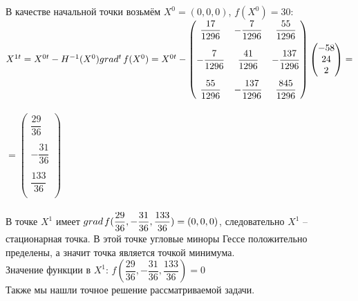 \documentclass[14pt,a4paper,fleqn]{extarticle}
\begin{document}
	В качестве начальной точки возьмём $X^0 = (0,0,0)$, $f(X^0) = 30$:\\
	
	$X^{1t} = X^{0t} - H^{-1}(X^0)grad^t\hspace*{0.05cm}f(X^0) = X^{0t} - \begin{pmatrix}
		\dfrac{17}{1296} & -\dfrac{7}{1296} & \dfrac{55}{1296}\\\\
		-\dfrac{7}{1296} & \dfrac{41}{1296} & -\dfrac{137}{1296}\\\\
		\dfrac{55}{1296} & -\dfrac{137}{1296} & \dfrac{845}{1296}\\
	\end{pmatrix}\begin{pmatrix}-58\\ 24\\ 2\\ \end{pmatrix} =$\\\\
	$= \begin{pmatrix}\dfrac{29}{36}\\\\ -\dfrac{31}{36}\\\\ \dfrac{133}{36}\\ \end{pmatrix}$\\\\
	
	В точке $X^1$ имеет $grad\hspace*{0.05cm}f(\dfrac{29}{36}, -\dfrac{31}{36}, \dfrac{133}{36}) = (0,0,0)$, следовательно $X^1$ -- стационарная точка. В этой точке угловые миноры Гессе положительно пределены, а значит точка является точкой минимума.\\
	Значение функции в $X^1$: $f(\dfrac{29}{36}, -\dfrac{31}{36}, \dfrac{133}{36}) = 0$\\
	Также мы нашли точное решение рассматриваемой задачи.
\end{document}
